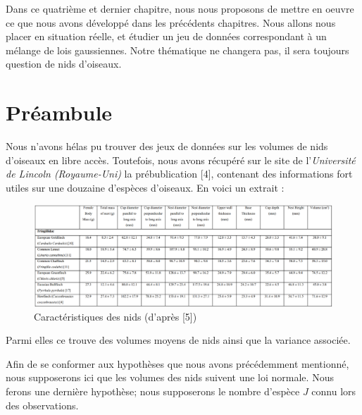 \documentclass[frenchb]{report}
\newcommand{\1}{\mathbbm{1}}
\theoremstyle{definition}\newtheorem{defn}{Définition}
\theoremstyle{definition}\newtheorem{exm}{Exemple}
\theoremstyle{definition}\newtheorem{nota}{Notation}
\theoremstyle{definition}\newtheorem{rem}{Remarque}
\begin{document}
Dans ce quatrième et dernier chapitre, nous nous proposons de mettre en oeuvre ce que nous avons développé dans les précédents chapitres. Nous allons nous placer en situation réelle, et étudier un jeu de données correspondant à un mélange de lois gaussiennes. Notre thématique ne changera pas, il sera toujours question de nids d'oiseaux. 

\section{Préambule}

Nous n'avons hélas pu trouver des jeux de données sur les volumes de nids d'oiseaux en libre accès. Toutefois, nous avons récupéré sur le site de l'\textit{Université de Lincoln (Royaume-Uni)} la prébublication [4], contenant des informations fort utiles sur une douzaine d'espèces d'oiseaux.
En voici un extrait :
\begin{figure}[H]
\centering
\includegraphics[scale = 0.5]{tab_oiseaux.png}
\caption{Caractéristiques des nids (d'après [5])}
\end{figure}

Parmi elles ce trouve des volumes moyens de nids ainsi que la variance associée. \newline


Afin de se conformer aux hypothèses que nous avons précédemment mentionné, nous supposerons ici que les volumes des nids suivent une loi normale. Nous ferons une dernière hypothèse; nous supposerons le nombre d'espèce $J$ connu lors des observations. \newline
\end{document}
